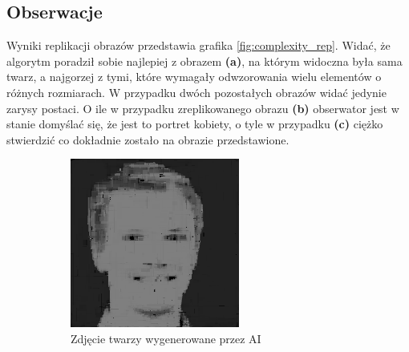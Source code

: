 \subsection{Obserwacje}
Wyniki replikacji obrazów przedstawia grafika \ref{fig:complexity_rep}. Widać, że algorytm poradził sobie najlepiej z obrazem \textbf{(a)}, na którym widoczna była sama twarz, a najgorzej z tymi, które wymagały odwzorowania wielu elementów o różnych rozmiarach. W przypadku dwóch pozostałych obrazów widać jedynie zarysy postaci. O ile w przypadku zreplikowanego obrazu \textbf{(b)} obserwator jest w stanie domyślać się, że jest to portret kobiety, o tyle w przypadku \textbf{(c)} ciężko stwierdzić co dokładnie zostało na obrazie przedstawione.

\begin{figure}[!htb]
    \centering
    \begin{subfigure}[b]{0.3\textwidth}
        \centering
        \label{fig:complexity_ai_rep}
         \includegraphics[width=\textwidth]{images/complexity/ai.png}
         \caption{Zdjęcie twarzy wygenerowane przez AI}
    \end{subfigure}
    \begin{subfigure}[b]{0.3\textwidth}
        \centering
        \label{fig:complexity_mona_rep}

\end{subfigure}
\end{figure}
